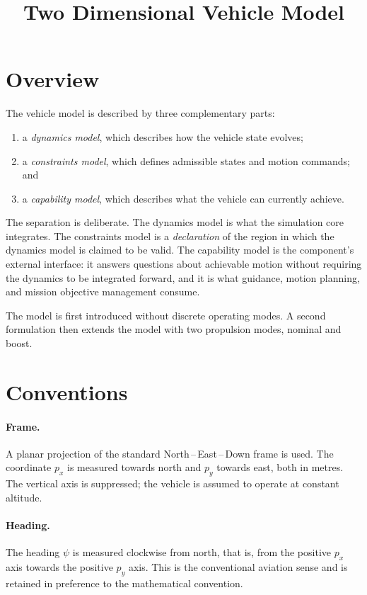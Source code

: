 \documentclass[11pt,a4paper]{article}
\title{Two Dimensional Vehicle Model}
\author{}
\date{}
\begin{document}
\maketitle

\section{Overview}

The vehicle model is described by three complementary parts:

\begin{enumerate}
  \item a \emph{dynamics model}, which describes how the vehicle state evolves;
  \item a \emph{constraints model}, which defines admissible states and motion
        commands; and
  \item a \emph{capability model}, which describes what the vehicle can
        currently achieve.
\end{enumerate}

The separation is deliberate. The dynamics model is what the simulation core
integrates. The constraints model is a \emph{declaration} of the region in which
the dynamics model is claimed to be valid. The capability model is the
component's external interface: it answers questions about achievable motion
without requiring the dynamics to be integrated forward, and it is what guidance,
motion planning, and mission objective management consume.

The model is first introduced without discrete operating modes. A second
formulation then extends the model with two propulsion modes, nominal and boost.

\section{Conventions}
\label{sec:conventions}

\paragraph{Frame.}
A planar projection of the standard North\,--\,East\,--\,Down frame is used.
The coordinate $p_x$ is measured towards north and $p_y$ towards east, both in
metres. The vertical axis is suppressed; the vehicle is assumed to operate at
constant altitude.

\paragraph{Heading.}
The heading $\psi$ is measured clockwise from north, that is, from the positive
$p_x$ axis towards the positive $p_y$ axis. This is the conventional aviation
sense and is retained in preference to the mathematical convention.
\end{document}
